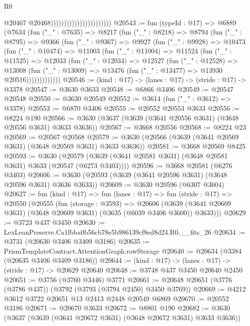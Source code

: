\begin{lexlean}{R0}
\begin{coremodule}
                                                @20467 @20468)))))))))))))))))))))))
@20543 := fun (typeId : @17) =>
  @6889
    (@7634
      (fun ("_" : @7635) =>
      @8217
        (fun ("_" : @8218) =>
        @8794
          (fun ("_" : @8795) =>
          @9366
            (fun ("_" : @9367) =>
            @9927
              (fun ("_" : @9928) =>
              @10473
                (fun ("_" : @10474) =>
                @11003
                  (fun ("_" : @11004) =>
                  @11524
                    (fun ("_" : @11525) =>
                    @12033
                      (fun ("_" : @12034) =>
                      @12527
                        (fun ("_" : @12528) =>
                        @13008
                          (fun ("_" : @13009) =>
                          @13476 (fun ("_" : @13477) => @13930 @20516)))))))))))))
@20546 := (kind : @17) -> (lanes : @17) -> (stride : @17) -> @3378
@20547 := @3630 @3633
@20548 := @6866 @3406
@20549 := @20547 @20548
@20550 := @3630 @20549
@20552 := @3614 (fun ("_" : @3612) => @3378)
@20553 := @6870 @3406
@20555 := @20552 @20553 @3633
@20556 := @8224 @190
@20566 := @3630 (@3637 (@3639 (@3641 @20556 @3631) (@3648 @20556 @3631) @3633 @3636))
@20567 := @3668 @20556
@20568 := @8224 @23
@20569 := @20567 @20568
@20579 := @3630 (@20566 (@3639 (@3641 @20569 @3631) (@3648 @20569 @3631) @3633 @3636))
@20581 := @3668 @20569 @8425
@20593 := @3630
    (@20579 (@3639 (@3641 @20581 @3631) (@3648 @20581 @3631) @3633 (@20547 (@6273 @3403))))
@20596 := @3668 @20581 (@6276 @3403)
@20606 := @3630 (@20593 (@3639 (@3641 @20596 @3631) (@3648 @20596 @3631) @3636 @3633))
@20609 := @3630 @20596 (@6307 @3604)
@20627 := fun (kind : @17) =>
  fun (lanes : @17) =>
  fun (stride : @17) =>
  @20550
    (@20555
      (fun (storage : @3593) =>
      @20606 (@3639 (@3641 @20609 @3631) (@3648 @20609 @3631) (@3635 (@6039 @3406 @3600)) @3633)))
@20629 := @3723 @437 @3450
@20630 := LexLeanPreserve.Ca1fbba0b56cb78e5b986139cf8ed8d24.R0.__fits_26
@20634 := @3731 (@20630 @3406 @3409 @3186)
@20635 := PrismTemplateContract.AttentionGraph.rowStorage
@20640 := @20634 (@3384 (@20635 @3406 @3409 @3186))
@20644 := (kind : @17) -> (lanes : @17) -> (stride : @17) -> @20629 @20640
@20648 := @3748 @437 @3450 @20640 @2450
@20651 := @3756 (@3760 @3446) @3771
@20661 := @20648 @20651 (@3776 (@3786 @437)) (@3792 (@3793 (@3794 @2450) @3450 @3769))
@20669 := @4212 @3612 @3722 @20651 @13 @2413 @2448 @20549 @6869
@20670 := @20552 @3186
@20671 := @20670 @3633
@20672 := @8801 @190
@20682 := @3630 (@3637 (@3639 (@3641 @20672 @3631) (@3648 @20672 @3631) @3633 @3636))

\end{coremodule}
\end{lexlean}
